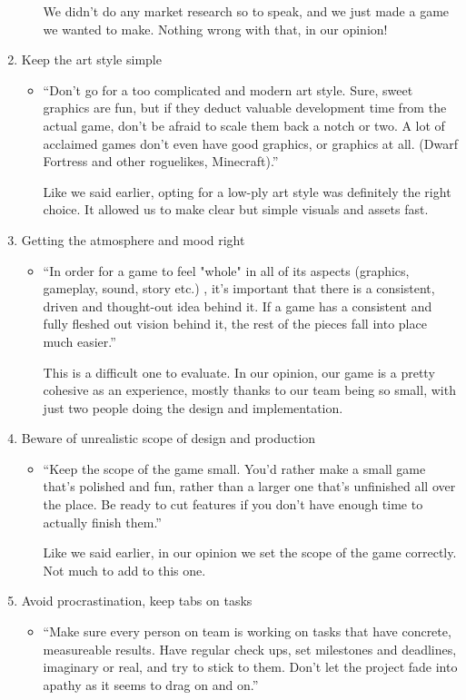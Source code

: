 \documentclass[
  oneside,
  11pt, a4paper,
  footinclude=true,
  headinclude=true,
  cleardoublepage=empty
]{scrbook}
\begin{document}
\begin{enumerate}
\begin{itemize}
    We didn't do any market research so to speak, and we just made a game we wanted to make. Nothing wrong with that, in our opinion!
    \end{itemize}
\item Keep the art style simple
    \begin{itemize}
    \item ``Don't go for a too complicated and modern art style. Sure, sweet graphics are fun, but if they deduct valuable development time from the actual game, don't be afraid to scale them back a notch or two. A lot of acclaimed games don't even have good graphics, or graphics at all. (Dwarf Fortress and other roguelikes, Minecraft).''
    
    \medskip
    Like we said earlier, opting for a low-ply art style was definitely the right choice. It allowed us to make clear but simple visuals and assets fast.
    \end{itemize}
\item Getting the atmosphere and mood right
    \begin{itemize}
    \item ``In order for a game to feel "whole" in all of its aspects (graphics, gameplay, sound, story etc.) , it's important that there is a consistent, driven and thought-out idea behind it. If a game has a consistent and fully fleshed out vision behind it, the rest of the pieces fall into place much easier.''
    
    \medskip
    This is a difficult one to evaluate. In our opinion, our game is a pretty cohesive as an experience, mostly thanks to our team being so small, with just two people doing the design and implementation.
    \end{itemize}
\item Beware of unrealistic scope of design and production
    \begin{itemize}
    \item ``Keep the  scope of the game small. You'd rather make a small game that's polished and fun, rather than a larger one that's unfinished all over the place. Be ready to cut features if you don't have enough time to actually finish them.''
    
    \medskip
    Like we said earlier, in our opinion we set the scope of the game correctly. Not much to add to this one.
    \end{itemize}
\item Avoid procrastination, keep tabs on tasks
    \begin{itemize}
    \item ``Make sure every person on team is working on tasks that have concrete, measureable results. Have regular check ups, set milestones and deadlines, imaginary or real, and try to stick to them. Don't let the project fade into apathy as it seems to drag on and on.''
    

\end{itemize}
\end{enumerate}
\end{document}
